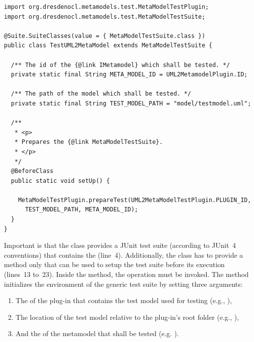 \lstset{
  language=Java
}
\begin{lstlisting}[caption={An instantiation of the generic metamodel test suite.}, captionpos=b, label=list:metaModelTestSuite:constraints01, float]
import org.dresdenocl.metamodels.test.MetaModelTestPlugin;
import org.dresdenocl.metamodels.test.MetaModelTestSuite;

@Suite.SuiteClasses(value = { MetaModelTestSuite.class })
public class TestUML2MetaModel extends MetaModelTestSuite {

  /** The id of the {@link IMetamodel} which shall be tested. */
  private static final String META_MODEL_ID = UML2MetamodelPlugin.ID;

  /** The path of the model which shall be tested. */
  private static final String TEST_MODEL_PATH = "model/testmodel.uml";

  /**
   * <p>
   * Prepares the {@link MetaModelTestSuite}.
   * </p>
   */
  @BeforeClass
  public static void setUp() {

    MetaModelTestPlugin.prepareTest(UML2MetaModelTestPlugin.PLUGIN_ID, 
      TEST_MODEL_PATH, META_MODEL_ID);
  }
}
\end{lstlisting}

Important is that the class provides a JUnit test suite (according to JUnit~4
conventions) that contains the  (line~4).
Additionally, the class has to provide a  method only that can be 
used to setup the test suite before its execution (lines~13 to~23). Inside the 
 method, the operation
 must be invoked. 
The method initializes the environment of the generic test suite by setting 
three arguments:

\begin{enumerate}
	\item The  of the plug-in that contains the test model used for 
	  testing (e.g.,
	  ),
	\item The location of the test model relative to the plug-in's root folder 
	  (e.g., ),
	\item And the  of the metamodel that shall be tested (e.g. 
	  ).
\end{enumerate}

